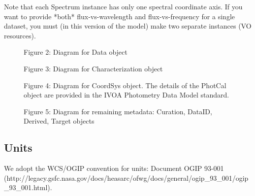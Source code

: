 \documentclass[11pt]{article}
\newcommand{\new}{\color{red}}
\begin{document}
Note that each Spectrum instance has only one spectral coordinate axis.
If you want to provide *both* flux-vs-wavelength and flux-vs-frequency
for a single dataset, you must (in this version of the model)
make two separate instances (VO resources).

\begin{figure}[h]

\colorbox{iblue}{
}
{
\colorbox{iblue}{
\begin{minipage}{6.0in}
Figure 2: Diagram for Data object

\end{minipage}
}
}

\colorbox{iblue}{
}
{
\colorbox{iblue}{
\begin{minipage}{6.0in}
Figure 3: Diagram for Characterization object
\end{minipage}
}
}

\end{figure}


\begin{figure}[h]


\colorbox{iblue}{
}
{
\colorbox{iblue}{
\begin{minipage}{6.0in}
Figure 4: Diagram for CoordSys object. {\new The details of the PhotCal
object are provided in the IVOA Photometry Data Model standard.}

\end{minipage}
}
}
\end{figure}


\begin{figure}[h]

\colorbox{iblue}{
}
{
\colorbox{iblue}{
\begin{minipage}{6.0in}
Figure 5:  Diagram for remaining metadata:
Curation, DataID, Derived, Target objects 

\end{minipage}
}
}
\end{figure}





\clearpage

\subsection{Units}

We adopt the WCS/OGIP convention for units: 
Document OGIP 93-001 \\
(http://legacy.gsfc.nasa.gov/docs/heasarc/ofwg/docs/general/ogip\_93\_001/ogip\_93\_001.html).
\end{document}
